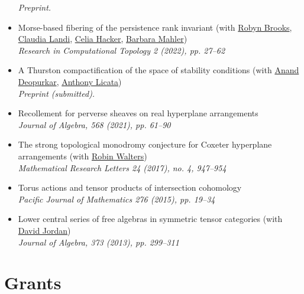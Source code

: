 \documentclass[a4paper]{moderncv}
\begin{document}
\begin{itemize}
\emph{Preprint.}
\item Morse-based fibering of the persistence rank invariant (with \href{https://sites.google.com/view/robynkayebrooks/home}{Robyn Brooks}, \href{http://personale.unimore.it/Rubrica/Dettaglio/clandi}{Claudia Landi}, \href{https://people.epfl.ch/celia.hacker/?lang=en}{Celia Hacker}, \href{https://www.maths.ox.ac.uk/people/barbara.mahler}{Barbara Mahler})\\
\emph{Research in Computational Topology 2 (2022), pp. 27--62}
\item A Thurston compactification of the space of stability conditions (with \href{https://deopurkar.github.io}{Anand Deopurkar}, \href{https://maths-people.anu.edu.au/\~licatat/Home.html}{Anthony Licata})\\
\emph{Preprint (submitted).}
\item Recollement for perverse sheaves on real hyperplane arrangements\\
\emph{Journal of Algebra, 568 (2021), pp. 61--90}
\item The strong topological monodromy conjecture for Coxeter hyperplane arrangements (with \href{http://www.robinwalters.com/}{Robin Walters})\\
\emph{Mathematical Research Letters 24 (2017), no. 4, 947--954}
\item Torus actions and tensor products of intersection cohomology\\
\emph{Pacific Journal of Mathematics 276 (2015), pp. 19--34}
\item Lower central series of free algebras in symmetric tensor categories (with \href{http://www.maths.ed.ac.uk/\~djordan/}{David Jordan})\\
\emph{Journal of Algebra, 373 (2013), pp. 299--311}
\end{itemize}

\section*{Grants}
\label{sec:orgd3af234}
\end{document}
